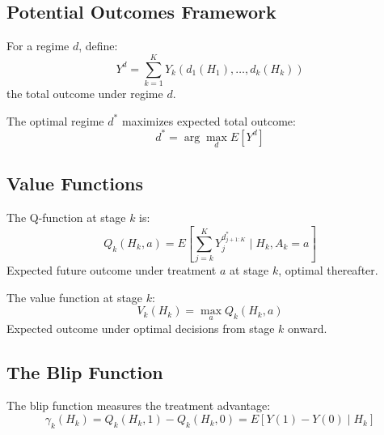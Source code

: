 \subsection{Potential Outcomes Framework}

For a regime $d$, define:
\begin{equation}
Y^d = \sum_{k=1}^K Y_k(d_1(H_1), \ldots, d_k(H_k))
\end{equation}
the total outcome under regime $d$.

\begin{definition}
The optimal regime $d^*$ maximizes expected total outcome:
\begin{equation}
d^* = \arg\max_d E[Y^d]
\end{equation}
\end{definition}

\subsection{Value Functions}

\begin{definition}[Q-Function]
The Q-function at stage $k$ is:
\begin{equation}
Q_k(H_k, a) = E\left[\sum_{j=k}^K Y_j^{d^*_{j+1:K}} \mid H_k, A_k = a\right]
\end{equation}
Expected future outcome under treatment $a$ at stage $k$, optimal thereafter.
\end{definition}

\begin{definition}
The value function at stage $k$:
\begin{equation}
V_k(H_k) = \max_a Q_k(H_k, a)
\end{equation}
Expected outcome under optimal decisions from stage $k$ onward.
\end{definition}

\subsection{The Blip Function}

\begin{definition}
The blip function measures the treatment advantage:
\begin{equation}
\gamma_k(H_k) = Q_k(H_k, 1) - Q_k(H_k, 0) = E[Y(1) - Y(0) \mid H_k]
\end{equation}
\end{definition}


